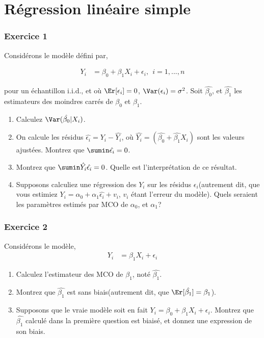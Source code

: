 \section{Régression linéaire simple}

\subsubsection*{Exercice 1}
Considérons le modèle défini par,

\begin{align*}
Y_i &= \beta_0 + \beta_1 X_i + \epsilon_i, \ \ i=1,...,n
\end{align*}

pour un échantillon i.i.d., et où $\Er[\epsilon_i] = 0$, $\Var(\epsilon_i) = \sigma^2$. Soit
$\hat{\beta_0}$, et $\hat{\beta_1}$ les estimateurs des moindres
carrés de $\beta_0$ et $\beta_1$.

\begin{enumerate}
\item Calculez $\Var(\hat{\beta_0} | X_i)$.
\item On calcule les résidus $\hat{\epsilon_i} = Y_i - \hat{Y_i}$, où
  $\hat{Y_i} = (\hat{\beta_0}
  + \hat{\beta_1}X_i)$ sont les valeurs ajustées. Montrez que $\sumin\hat{\epsilon_i} = 0$.
\item Montrez que $\sumin \hat{Y_i} \hat{\epsilon_i} = 0$. Quelle est
  l'interprétation de ce résultat.
\item Supposons calculiez une régression des $Y_i$ sur les résidus
  $\epsilon_i$(autrement dit, que vous estimiez $Y_i = \alpha_0 +
  \alpha_1\hat{\epsilon_i} + v_i$, $v_i$ étant l'erreur du
  modèle). Quels seraient les paramètres estimés par MCO de $\alpha_0$,
  et $\alpha_1$?
\end{enumerate}

\subsubsection*{Exercice 2}

Considérons le modèle,
\begin{align*}
Y_i &= \beta_1 X_i + \epsilon_i
\end{align*}

\begin{enumerate}
\item Calculez l'estimateur des MCO de $\beta_1$, noté
  $\hat{\beta_1}$.
\item Montrez que $\hat{\beta_1}$ est sans biais(autrement dit, que
  $\Er[\hat{\beta_1}] = \beta_1$).
\item Supposons que le vraie modèle soit en fait $Y_i = \beta_0 +
  \beta_1 X_i + \epsilon_i$. Montrez que $\hat{\beta_1}$ calculé dans
  la première question est biaisé, et donnez une expression de son biais.
\end{enumerate}


